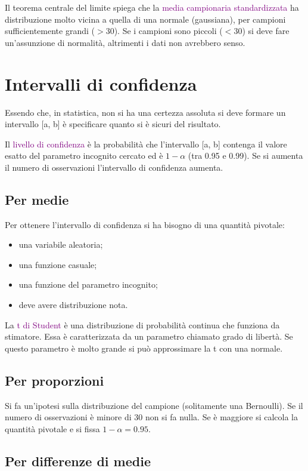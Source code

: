 Il teorema centrale del limite spiega che la \textcolor{purple}{media campionaria standardizzata} ha distribuzione molto vicina a quella di una normale (gaussiana), per campioni sufficientemente grandi ($>$30). Se i campioni sono piccoli ($<$30) si deve fare un'assunzione di normalità, altrimenti i dati non avrebbero senso.

\section{Intervalli di confidenza}

Essendo che, in statistica, non si ha una certezza assoluta si deve formare un intervallo [a, b] è specificare quanto si è sicuri del risultato.

Il \textcolor{purple}{livello di confidenza} è la probabilità che l'intervallo [a, b] contenga il valore esatto del parametro incognito cercato ed è $1 - \alpha$ (tra 0.95 e 0.99). Se si aumenta il numero di osservazioni l'intervallo di confidenza aumenta.

\subsection{Per medie}

Per ottenere l'intervallo di confidenza si ha bisogno di una quantità pivotale:
\begin{itemize}
    \item una variabile aleatoria;
    \item una funzione casuale;
    \item una funzione del parametro incognito;
    \item deve avere distribuzione nota.
\end{itemize}

La \textcolor{purple}{t di Student} è una distribuzione di probabilità continua che funziona da stimatore. Essa è caratterizzata da un parametro chiamato grado di libertà. Se questo parametro è molto grande si può approssimare la t con una normale.
\subsection{Per proporzioni}

Si fa un'ipotesi sulla distribuzione del campione (solitamente una Bernoulli). Se il numero di osservazioni è minore di 30 non si fa nulla. Se è maggiore si calcola la quantità pivotale e si fissa $1 - \alpha = 0.95$.

\subsection{Per differenze di medie}

